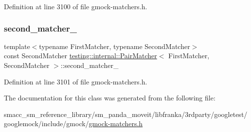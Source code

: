 Definition at line 3100 of file gmock-\/matchers.\+h.

\mbox{\label{classtesting_1_1internal_1_1PairMatcher_a2ff03fa2ac3d715052feb21b7b61084d}} 
\subsubsection{\texorpdfstring{second\+\_\+matcher\+\_\+}{second\_matcher\_}}
{\footnotesize\ttfamily template$<$typename First\+Matcher, typename Second\+Matcher$>$ \\
const Second\+Matcher \hyperlink{classtesting_1_1internal_1_1PairMatcher}{testing\+::internal\+::\+Pair\+Matcher}$<$ First\+Matcher, Second\+Matcher $>$\+::second\+\_\+matcher\+\_\+\hspace{0.3cm}{\ttfamily [private]}}



Definition at line 3101 of file gmock-\/matchers.\+h.



The documentation for this class was generated from the following file\+:\begin{DoxyCompactItemize}
\item 
smacc\+\_\+sm\+\_\+reference\+\_\+library/sm\+\_\+panda\+\_\+moveit/libfranka/3rdparty/googletest/googlemock/include/gmock/\hyperlink{gmock-matchers_8h}{gmock-\/matchers.\+h}\end{DoxyCompactItemize}
